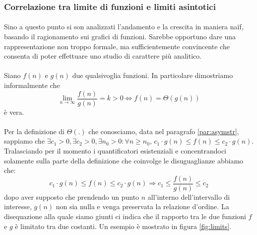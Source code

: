 \documentclass[11pt,a4paper,oneside]{article}
\begin{document}
\subsubsection{Correlazione tra limite di funzioni e limiti asintotici}
\paragraph*{}Sino a questo punto si son analizzati l'andamento e la crescita in maniera naïf, basando il ragionamento sui grafici di funzioni. Sarebbe opportuno dare una rappresentazione non troppo formale, ma sufficientemente convincente che consenta di poter effettuare uno studio di carattere più analitico. 
\paragraph*{} Siano $f(n)$ e $g(n)$ due qualsivoglia funzioni. In particolare dimostriamo informalmente che 
\begin{equation}
\lim_{n\to \infty} \frac{f(n)}{g(n)} = k > 0 \Leftrightarrow f(n) = \Theta(g(n))
\label{eq:equiv}
\end{equation}
è vera.
\paragraph*{} Per la definizione di $\Theta(.)$ che conosciamo, data nel paragrafo \ref{par:asymstr}, sappiamo che $\exists c_1>0, \exists c_2 > 0, \exists n_0 > 0 : \forall n \geq n_0,\,c_1\cdot g(n) \leq f(n) \leq c_2\cdot g(n)$. Tralasciando per il momento i quantificatori esistenziali e concentrandoci solamente sulla parte della definizione che coinvolge le disuguaglianze abbiamo che: 
\begin{equation}
c_1 \cdot g(n) \leq f(n) \leq c_2\cdot g(n) \Rightarrow c_1 \leq \frac{f(n)}{g(n)} \leq c_2 \label{eq:eq1}
\end{equation} dopo aver supposto che prendendo un punto $n$ all'interno dell'intervallo di interesse, $g(n)$ non sia nulla e venga preservata la relazione d'ordine. La disequazione alla quale siamo giunti ci indica che il rapporto tra le due funzioni $f$ e $g$ è limitato tra due costanti. Un esempio è mostrato in figura \ref{fig:limits}.
\end{document}
